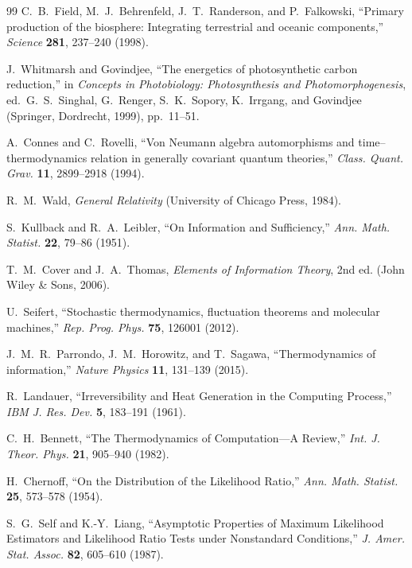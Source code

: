 \documentclass[10pt]{article}
\begin{document}
\begin{thebibliography}{99}
C.~B.~Field, M.~J.~Behrenfeld, J.~T.~Randerson, and P.~Falkowski,
``Primary production of the biosphere: Integrating terrestrial and oceanic components,''
\emph{Science} \textbf{281}, 237--240 (1998).

J.~Whitmarsh and Govindjee,
``The energetics of photosynthetic carbon reduction,''
in \emph{Concepts in Photobiology: Photosynthesis and Photomorphogenesis},
ed.~G.~S.~Singhal, G.~Renger, S.~K.~Sopory, K.~Irrgang, and Govindjee
(Springer, Dordrecht, 1999), pp.~11--51.

A.~Connes and C.~Rovelli,
``Von Neumann algebra automorphisms and time--thermodynamics relation in generally covariant quantum theories,''
\emph{Class. Quant. Grav.} \textbf{11}, 2899--2918 (1994).

R.~M.~Wald,
\emph{General Relativity}
(University of Chicago Press, 1984).

S.~Kullback and R.~A.~Leibler,
``On Information and Sufficiency,''
\emph{Ann. Math. Statist.} \textbf{22}, 79--86 (1951).

T.~M.~Cover and J.~A.~Thomas,
\emph{Elements of Information Theory}, 2nd ed.
(John Wiley \& Sons, 2006).

U.~Seifert,
``Stochastic thermodynamics, fluctuation theorems and molecular machines,''
\emph{Rep. Prog. Phys.} \textbf{75}, 126001 (2012).

J.~M.~R.~Parrondo, J.~M.~Horowitz, and T.~Sagawa,
``Thermodynamics of information,''
\emph{Nature Physics} \textbf{11}, 131--139 (2015).

R.~Landauer,
``Irreversibility and Heat Generation in the Computing Process,''
\emph{IBM J. Res. Dev.} \textbf{5}, 183--191 (1961).

C.~H.~Bennett,
``The Thermodynamics of Computation---A Review,''
\emph{Int. J. Theor. Phys.} \textbf{21}, 905--940 (1982).

H.~Chernoff,
``On the Distribution of the Likelihood Ratio,''
\emph{Ann. Math. Statist.} \textbf{25}, 573--578 (1954).

S.~G.~Self and K.-Y.~Liang,
``Asymptotic Properties of Maximum Likelihood Estimators and Likelihood Ratio Tests under Nonstandard Conditions,''
\emph{J. Amer. Stat. Assoc.} \textbf{82}, 605--610 (1987).


\end{thebibliography}
\end{document}
